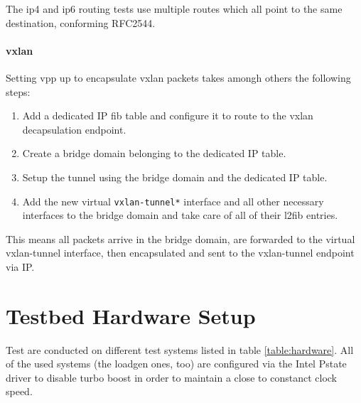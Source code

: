 The \Ac{ip4} and \Ac{ip6} routing tests use multiple routes which all
point to the same destination, conforming RFC2544.

\paragraph{\Ac{vxlan}}

Setting \Ac{vpp} up to encapsulate \Ac{vxlan} packets takes amongh
others the following steps:

\begin{enumerate}
	\item Add a dedicated IP \Ac{fib} table and configure it to route to the \Ac{vxlan} decapsulation endpoint.
	\item Create a bridge domain belonging to the dedicated IP table.
	\item Setup the tunnel using the bridge domain and the dedicated IP table.
	\item Add the new virtual \lstinline|vxlan-tunnel*| interface and all other necessary interfaces to the bridge domain and take care of all of their l2fib entries. 
\end{enumerate}

This means all packets arrive in the bridge domain, are forwarded to
the virtual vxlan-tunnel interface, then encapsulated and sent to the
vxlan-tunnel endpoint via IP.


\section{Testbed Hardware Setup}
\label{sec:hardware}

Test are conducted on different test systems listed in table
\ref{table:hardware}. All of the used systems (the \Ac{loadgen} ones,
too) are configured via the Intel Pstate driver to disable turbo boost
in order to maintain a close to constanct clock speed.


